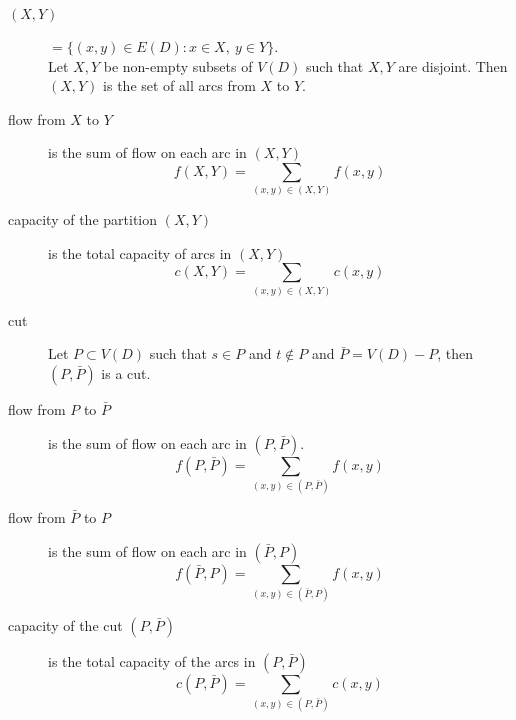 \begin{description}
	\item[$(X,Y)$] $=\{ (x,y) \in E(D) : x \in X,\ y \in Y \}$.\\
		Let $X,Y$ be non-empty subsets of $V(D)$ such that $X,Y$ are disjoint.
		Then $(X,Y)$ is the set of all arcs from $X$ to $Y$.
	\item[flow from $X$ to $Y$] is the sum of flow on each arc in $(X,Y)$
		\begin{equation}
		f(X,Y) = \sum_{(x,y) \in (X,Y)} f(x,y)
		\end{equation}
	\item[capacity of the partition $(X,Y)$] is the total capacity of arcs in $(X,Y)$
		\begin{equation}
		c(X,Y) = \sum_{(x,y) \in (X,Y)} c(x,y)
		\end{equation}
	\item[cut] Let $P \subset V(D)$ such that $s \in P$ and $t \notin P$ and $\bar{P} = V(D)-P$, then $(P,\bar{P})$ is a cut.
	\item[flow from $P$ to $\bar{P}$] is the sum of flow on each arc in $(P,\bar{P})$.
		\begin{equation}
		f(P,\bar{P}) = \sum_{(x,y) \in (P,\bar{P})} f(x,y)
		\end{equation}
	\item[flow from $\bar{P}$ to $P$] is the sum of flow on each arc in $(\bar{P},P)$
		\begin{equation}
		f(\bar{P},P) = \sum_{(x,y) \in (\bar{P},P)} f(x,y)
		\end{equation}
	\item[capacity of the cut $(P,\bar{P})$] is the total capacity of the arcs in $(P,\bar{P})$
		\begin{equation}
		c(P,\bar{P}) = \sum_{(x,y) \in (P,\bar{P})} c(x,y)
		\end{equation}
\end{description}

